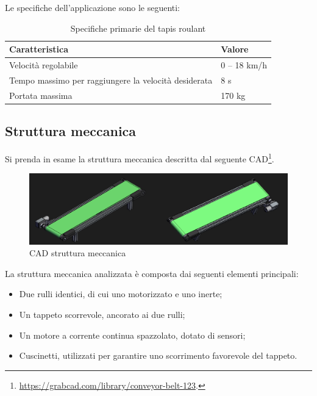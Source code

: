 \documentclass[a4paper,12pt]{article}
\begin{document}
Le specifiche dell'applicazione sono le seguenti:

\begin{table}[h!]
    \centering
    \begin{tabular}{|l|l|}
    \hline
    \textbf{Caratteristica} & \textbf{Valore} \\ \hline
    Velocità regolabile & 0 -- 18 km/h \\ \hline
    Tempo massimo per raggiungere la velocità desiderata & 8 s \\ \hline
    Portata massima & 170 kg \\ \hline
    \end{tabular}
    \caption{Specifiche primarie del tapis roulant}
\end{table}

\subsection{Struttura meccanica}
Si prenda in esame la struttura meccanica descritta dal seguente CAD\footnote{\url{https://grabcad.com/library/conveyor-belt-123}.}.

\begin{figure}[h!]
    \centering
    \includegraphics[scale=0.35]{Immagini/Altre/CADtappeto.PNG}
    \caption{CAD struttura meccanica}
    \label{fig: CAD}
\end{figure}

\vspace{0.5cm}

La struttura meccanica analizzata è composta dai seguenti elementi principali:

\begin{itemize}
    \item Due rulli identici, di cui uno motorizzato e uno inerte;
    \item Un tappeto scorrevole, ancorato ai due rulli;
    \item Un motore a corrente continua spazzolato, dotato di sensori;
    \item Cuscinetti, utilizzati per garantire uno scorrimento favorevole del tappeto.
\end{itemize}
\end{document}
